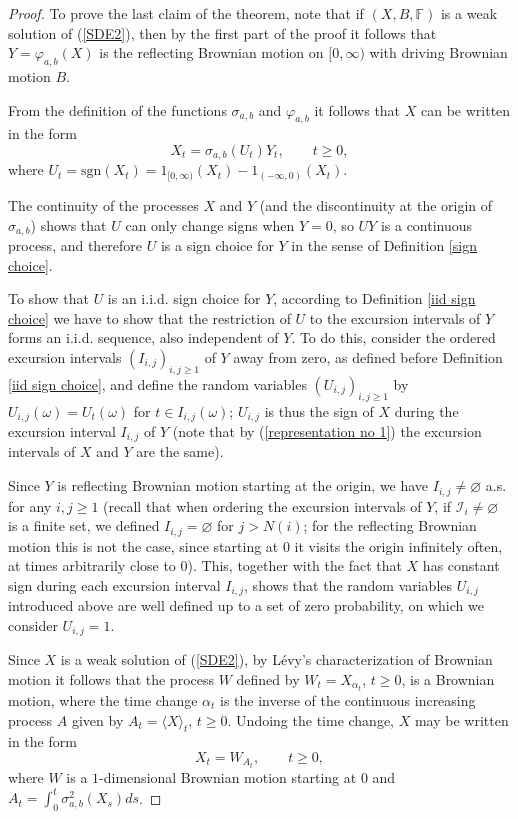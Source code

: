 \documentclass[reqno]{amsart}
\theoremstyle{definition}
\theoremstyle{remark}
\numberwithin{equation}{section}
\begin{document}
\begin{proof}
To prove the last claim of the theorem, note that if $\left( X,B,\mathbb{F}\right)$ is a weak solution of (\ref{SDE2}), then by the first part of the proof it follows that $Y=\varphi_{a,b}(X)$ is the reflecting Brownian motion on $[0,\infty)$ with driving Brownian motion $B$.

From the definition of the functions $\sigma_{a,b}$ and $\varphi_{a,b}$ it follows that $X$ can be written in the form
\begin{equation}\label{representation no 1}
X_t=\sigma_{a,b}(U_t)Y_t, \qquad t\geq 0,
\end{equation}
where $U_t=\mathrm{sgn}(X_t)=1_{[0,\infty)}(X_t)-1_{(-\infty,0)}(X_t)$.

The continuity of the processes $X$ and $Y$ (and the discontinuity at the origin of $\sigma_{a,b}$) shows that $U$ can only change signs when $Y=0$, so $U Y$ is a continuous process, and therefore $U$ is a sign choice for $Y$ in the sense of Definition \ref{sign choice}.

To show that $U$ is an i.i.d. sign choice for $Y$, according to Definition \ref{iid sign choice} we have to show that the restriction of $U$ to the excursion intervals of $Y$ forms an i.i.d. sequence, also independent of $Y$. To do this, consider the ordered excursion intervals $(I_{i,j})_{i,j\geq 1}$ of $Y$ away from zero, as defined before Definition \ref{iid sign choice}, and define the random variables $(U_{i,j})_{i,j\geq 1}$ by $U_{i,j}(\omega)=U_t(\omega)$ for $t\in I_{i,j}(\omega)$; $U_{i,j}$ is thus the sign of $X$ during the excursion interval $I_{i,j}$ of $Y$ (note that by (\ref{representation no 1}) the excursion intervals of $X$ and $Y$ are the same).

Since $Y$ is reflecting Brownian motion starting at the origin, we have $I_{i,j}\ne \varnothing$ a.s. for any $i,j\geq 1$ (recall that when ordering the excursion intervals of $Y$, if $\mathcal{I}_i\neq \varnothing $ is a finite set, we defined $I_{i,j}=\varnothing$ for $j>N(i)$; for the reflecting Brownian motion this is not the case, since starting at $0$ it visits the origin infinitely often, at times arbitrarily close to $0$). This, together with the fact that $X$ has constant sign during each excursion interval $I_{i,j}$, shows that the random variables $U_{i,j}$ introduced above are well defined up to a set of zero probability, on which we consider $U_{i,j}=1$.

Since $X$ is a weak solution of (\ref{SDE2}), by L\'{e}vy's characterization of Brownian motion it follows that the process $W$ defined by $W_t=X_{\alpha_t}$, $t\ge0$, is a Brownian motion, where the time change $\alpha_t$ is the inverse of the continuous increasing process $A$ given by $A_t=\langle X\rangle _t$, $t\ge 0$. Undoing the time change, $X$ may be written in the form
\begin{equation}\label{representation no 2}
X_t=W_{A_t}, \qquad t\geq 0,
\end{equation}
where $W$ is a $1$-dimensional Brownian motion starting at $0$ and $A_t=\int_0^t \sigma_{a,b}^2(X_s) ds$.


\end{proof}
\end{document}
